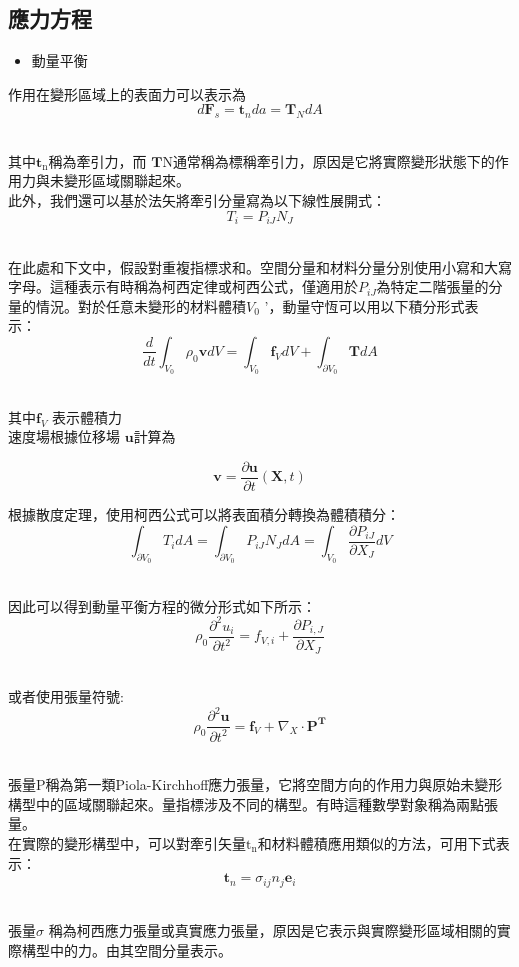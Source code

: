 \subsection{應力方程}

\begin{itemize}
\item 動量平衡
\end{itemize}

作用在變形區域上的表面力可以表示為\
$$d \mathbf{F}_s=\mathbf{t}_n d a=\mathbf{T}_N d A$$\

其中$\mathbf{t}_{\mathrm{n}}$稱為牽引力，而 $\mathbf{T} \mathrm{N}$通常稱為標稱牽引力，原因是它將實際變形狀態下的作用力與未變形區域關聯起來。\\

此外，我們還可以基於法矢將牽引分量寫為以下線性展開式：\
$$T_i=P_{i J} N_J$$\

在此處和下文中，假設對重複指標求和。空間分量和材料分量分別使用小寫和大寫字母。這種表示有時稱為柯西定律或柯西公式，僅適用於$P_{i J}$為特定二階張量的分量的情況。對於任意未變形的材料體積$V_0$ '，動量守恆可以用以下積分形式表示：\
$$\frac{d}{d t} \int_{V_0} \rho_0 \mathbf{v} d V=\int_{V_0} \mathbf{f}_V d V+\int_{\partial V_0} \mathbf{T} d A$$\

其中$\mathbf{f}_V$ 表示體積力\\

速度場根據位移場 $\mathbf{u}$計算為\

$$\mathbf{v}=\frac{\partial \mathbf{u}}{\partial t}(\mathbf{X}, t)$$

根據散度定理，使用柯西公式可以將表面積分轉換為體積積分：\
$$\int_{\partial V_0} T_i d A=\int_{\partial V_0} P_{i J} N_J d A=\int_{V_0} \frac{\partial P_{i J}}{\partial X_J} d V$$\

因此可以得到動量平衡方程的微分形式如下所示：\
$$\rho_0 \frac{\partial^2 u_i}{\partial t^2}=f_{V, i}+\frac{\partial P_{i, J}}{\partial X_J}$$\

或者使用張量符號:\
$$\rho_0 \frac{\partial^2 \mathbf{u}}{\partial t^2}=\mathbf{f}_V+\nabla_X \cdot \mathbf{P}^{\mathbf{T}}$$\

張量P稱為第一類Piola-Kirchhoff應力張量，它將空間方向的作用力與原始未變形構型中的區域關聯起來。量指標涉及不同的構型。有時這種數學對象稱為兩點張量。\\

在實際的變形構型中，可以對牽引矢量$\mathrm{t}_{\mathrm{n}}$和材料體積應用類似的方法，可用下式表示：\
$$\mathbf{t}_n=\sigma_{i j} n_j \mathbf{e}_i$$\

張量$\sigma$ 稱為柯西應力張量或真實應力張量，原因是它表示與實際變形區域相關的實際構型中的力。由其空間分量表示。\\

